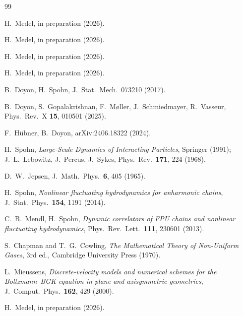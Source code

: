 \documentclass[aps,pre,twocolumn,superscriptaddress,longbibliography,floatfix]{revtex4-2}
\begin{document}
\begin{thebibliography}{99}

H.~Medel, in preparation (2026).

H.~Medel, in preparation (2026).

H.~Medel, in preparation (2026).

H.~Medel, in preparation (2026).

B.~Doyon, H.~Spohn,
J.~Stat.~Mech.\ 073210 (2017).

B.~Doyon, S.~Gopalakrishnan, F.~M{\o}ller,
J.~Schmiedmayer, R.~Vasseur,
Phys.~Rev.~X \textbf{15}, 010501 (2025).

F.~H\"ubner, B.~Doyon,
arXiv:2406.18322 (2024).

H.~Spohn,
\emph{Large-Scale Dynamics of Interacting Particles},
Springer (1991);
J.~L.~Lebowitz, J.~Percus, J.~Sykes,
Phys.~Rev.\ \textbf{171}, 224 (1968).

D.~W.~Jepsen,
J.~Math.~Phys.\ \textbf{6}, 405 (1965).

H.~Spohn,
\emph{Nonlinear fluctuating hydrodynamics for anharmonic
chains},
J.~Stat.~Phys.\ \textbf{154}, 1191 (2014).

C.~B.~Mendl, H.~Spohn,
\emph{Dynamic correlators of FPU chains and nonlinear
fluctuating hydrodynamics},
Phys.~Rev.~Lett.\ \textbf{111}, 230601 (2013).

S.~Chapman and T.~G.~Cowling,
\emph{The Mathematical Theory of Non-Uniform Gases},
3rd ed., Cambridge University Press (1970).

L.~Mieussens,
\emph{Discrete-velocity models and numerical schemes for the
Boltzmann--BGK equation in plane and axisymmetric geometries},
J.~Comput.~Phys.\ \textbf{162}, 429 (2000).

H.~Medel, in preparation (2026).

\end{thebibliography}
\end{document}
